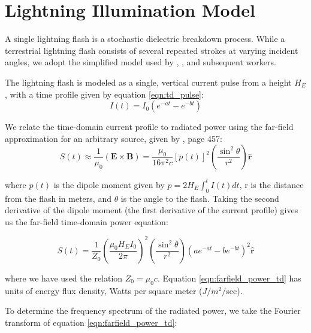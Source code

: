 \section{Lightning Illumination Model}
A single lightning flash is a stochastic dielectric breakdown process. While a terrestrial lightning flash consists of several repeated strokes at varying incident angles, we adopt the simplified model used by \citealt{Lauben1998}, \citealt{Bortnik2005}, and subsequent workers.

The lightning flash is modeled as a single, vertical current pulse from a height $H_E$, with a time profile given by equation \ref{eqn:td_pulse}:
\begin{equation}
\label{eqn:td_pulse}
I(t)=I_0(e^{-a t} - e^{-b t})
\end{equation}

We relate the time-domain current profile to radiated power using the far-field approximation for an arbitrary source, given by \cite{Griffiths1999}, page 457:
\begin{equation}
\label{eqn:griffiths_power}
S(t) \approx \frac{1}{\mu_0}(\mathbf{E} \times \mathbf{B}) = \frac{\mu_0}{16\pi^2c}\left[\ddot{p}(t)\right]^2 \left(\frac{\sin^2\theta}{r^2}\right)\mathbf{\hat{r}}
\end{equation}

where $p(t)$ is the dipole moment given by $p=2 H_E \int_0^t{I(t)}dt$, r is the distance from the flash in meters, and $\theta$ is the angle to the flash. Taking the second derivative of the dipole moment (the first derivative of the current profile) gives us the far-field time-domain power equation:

\begin{equation}
\label{eqn:farfield_power_td}
S(t) = \frac{1}{Z_0}\left(\frac{\mu_0 H_E I_0}{2 \pi}\right)^2\left(\frac{\sin^2\theta}{r^2}\right) \left(a e^{-a t} - b e^{-b t}\right)^2  \mathbf{\hat{r}}
\end{equation}

where we have used the relation $Z_0 = \mu_0 c$. Equation \ref{eqn:farfield_power_td} has units of energy flux density, Watts per square meter ($J/m^2/$sec).

To determine the frequency spectrum of the radiated power, we take the Fourier transform of equation \ref{eqn:farfield_power_td}:

